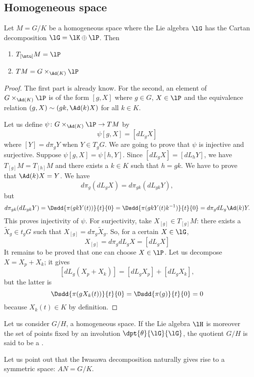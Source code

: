 \subsection{Homogeneous space}


\begin{proposition}
Let $M=G/K$ be a homogeneous space where the Lie algebra $\lG$ has the Cartan decomposition $\lG=\lK\oplus\lP$. Then
\begin{enumerate}
\item $T_{[\mtu]}M=\lP$
\item $TM=G\times_{\Ad(K)}\lP$
\end{enumerate}

\end{proposition}

\begin{proof}
The first part is already know. For the second, an element of $G\times_{\Ad(K)}\lP$ is of the form $[g,X]$ where $g\in G$, $X\in\lP$ and the equivalence relation $(g,X)\sim(gk,\Ad(k)X)$ for all $k\in K$.

Let us define $\psi\colon G\times_{\Ad(K)}\lP\to TM$ by
\[ 
  \psi[g,X]=[dL_gX]
\]
where $[Y]=d\pi_gY$ when $Y\in T_gG$. We are going to prove that $\psi$ is injective and surjective. Suppose $\psi[g,X]=\psi[h,Y]$. Since $[dL_gX]=[dL_hY]$, we have $T_{[g]}M=T_{[h]}M$ and there exists a $k\in K$ such that $h=gk$. We have to prove that $\Ad(k)X=Y$. We have
\[ 
  d\pi_g(dL_gX)=d\pi_{gk}(dL_{gk}Y),
\]
but
\[ 
  d\pi_{gk}(dL_{gk}Y)=\Dsdd{ \pi(gkY(t)) }{t}{0}
		=\Dsdd{ \pi(gkY(t)k^{-1}) }{t}{0}
		=d\pi_gdL_g\Ad(k)Y.
\]
This proves injectivity of $\psi$. For surjectivity, take $X_{[g]}\in T_{[g]}M$: there exists a $\tilde X_g\in t_gG$ such that $X_{[g]}=d\pi_g\tilde X_g$. So, for a certain $X\in\lG$, 
\[ 
  X_{[g]}=d\pi_gdL_gX
		=[dL_gX]
\]
It remains to be proved that one can choose $X\in\lP$. Let us decompose $X=X_p+X_k$; it gives
\[ 
  [dL_g(X_p+X_k)]=[dL_gX_p]+[dL_gX_k],
\]
but the latter is
\[ 
  \Dsdd{ \pi(gX_k(t)) }{t}{0}=\Dsdd{ \pi(g) }{t}{0}=0
\]
because $X_k(t)\in K$ by definition.
\end{proof}



Let us consider $G/H$, a homogeneous space. If the Lie algebra $\lH$ is moreover the set of points fixed by an involution $\dpt{\theta}{\lG}{\lG}$, the quotient $G/H$ is said to be a .

Let us point out that the Iwasawa decomposition naturally gives rise to a symmetric space: $AN=G/K$.

